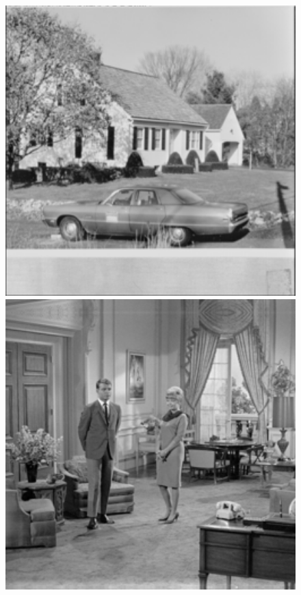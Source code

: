 \documentclass[runningheads]{llncs}
\begin{document}
\begin{figure}[t]
{\begin{minipage}{0.09\textwidth}
\end{minipage}
\begin{minipage}{0.09\textwidth}
\includegraphics[width=1.06\textwidth]{carhouse.png}
\end{minipage}
\begin{minipage}{0.09\textwidth}
\includegraphics[width=1.06\textwidth]{couple.png}

\end{minipage}}
\end{figure}
\end{document}
